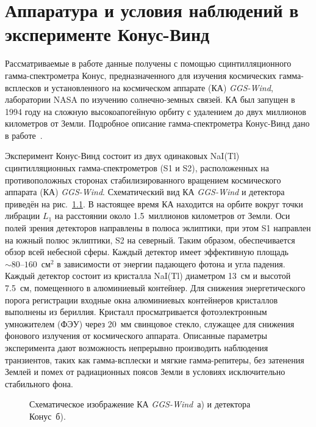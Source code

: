 \chapter{Аппаратура и условия наблюдений в эксперименте Конус-Винд} \label{chapt1}
Рассматриваемые в работе данные получены с помощью сцинтилляционного гамма-спектрометра 
Конус, предназначенного для изучения космических гамма-всплесков и установленного 
на космическом аппарате (КА) \textit{GGS-Wind}, лаборатории NASA по изучению 
солнечно-земных связей. КА был запущен в 1994 году на сложную высокоапогейную орбиту 
с удалением до двух миллионов километров от Земли. Подробное описание гамма-спектрометра 
Конус-Винд дано в работе~\citep{Aptekar_1995}.

Эксперимент Конус-Винд состоит из двух одинаковых NaI(Tl) сцинтилляционных 
гамма-спектрометров (S1 и S2), расположенных на противоположных сторонах 
стабилизированного вращением космического аппарата (КА) \textit{GGS-Wind}. 
Схематический вид КА \textit{GGS-Wind} и детектора приведён на рис.~\ref{img:KW_main_view}.
В настоящее время КА находится на орбите вокруг точки либрации $L_1$ 
на расстоянии около 1.5~миллионов километров от Земли. Оси полей зрения детекторов 
направлены в полюса эклиптики, при этом S1 направлен на южный полюс эклиптики, 
S2 на северный. Таким образом, обеспечивается обзор всей небесной сферы. 
Каждый детектор имеет эффективную площадь $\sim 80\textrm{--}160$~см$^2$ в 
зависимости от энергии падающего фотона и угла падения. Каждый детектор состоит 
из кристалла NaI(Tl) диаметром 13~см и высотой 7.5~см, помещенного в алюминиевый 
контейнер. Для снижения энергетического порога регистрации входные окна алюминиевых 
контейнеров кристаллов выполнены из бериллия. Кристалл просматривается фотоэлектронным 
умножителем (ФЭУ) через 20~мм свинцовое стекло, служащее для снижения фонового 
излучения от космического аппарата. Описанные параметры эксперимента дают 
возможность непрерывно производить наблюдения транзиентов, таких как гамма-всплески 
и мягкие гамма-репитеры, без затенения Землей и помех от радиационных поясов Земли 
в условиях исключительно стабильного фона. 

\begin{figure}[h]
  \begin{minipage}[h]{0.5\textwidth}
  \end{minipage}
  \hfill
  \begin{minipage}[h]{0.5\textwidth}
  \end{minipage}
  \caption[Схематическое изображение КА \textit{GGS-Wind} и детектора Конус.]
  {Схематическое изображение КА \textit{GGS-Wind}~а) и детектора Конус~б).}
  \label{img:KW_main_view}  
\end{figure}

